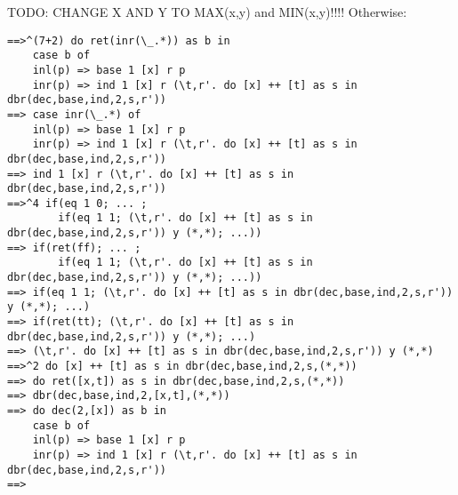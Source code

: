 TODO: CHANGE X AND Y TO MAX(x,y) and MIN(x,y)!!!!
Otherwise:
\begin{verbatim}
==>^(7+2) do ret(inr(\_.*)) as b in 
    case b of
    inl(p) => base 1 [x] r p
    inr(p) => ind 1 [x] r (\t,r'. do [x] ++ [t] as s in dbr(dec,base,ind,2,s,r')) 
==> case inr(\_.*) of 
    inl(p) => base 1 [x] r p
    inr(p) => ind 1 [x] r (\t,r'. do [x] ++ [t] as s in dbr(dec,base,ind,2,s,r')) 
==> ind 1 [x] r (\t,r'. do [x] ++ [t] as s in dbr(dec,base,ind,2,s,r')) 
==>^4 if(eq 1 0; ... ; 
        if(eq 1 1; (\t,r'. do [x] ++ [t] as s in dbr(dec,base,ind,2,s,r')) y (*,*); ...)) 
==> if(ret(ff); ... ; 
        if(eq 1 1; (\t,r'. do [x] ++ [t] as s in dbr(dec,base,ind,2,s,r')) y (*,*); ...)) 
==> if(eq 1 1; (\t,r'. do [x] ++ [t] as s in dbr(dec,base,ind,2,s,r')) y (*,*); ...) 
==> if(ret(tt); (\t,r'. do [x] ++ [t] as s in dbr(dec,base,ind,2,s,r')) y (*,*); ...) 
==> (\t,r'. do [x] ++ [t] as s in dbr(dec,base,ind,2,s,r')) y (*,*)
==>^2 do [x] ++ [t] as s in dbr(dec,base,ind,2,s,(*,*))
==> do ret([x,t]) as s in dbr(dec,base,ind,2,s,(*,*))
==> dbr(dec,base,ind,2,[x,t],(*,*))
==> do dec(2,[x]) as b in 
    case b of
    inl(p) => base 1 [x] r p
    inr(p) => ind 1 [x] r (\t,r'. do [x] ++ [t] as s in dbr(dec,base,ind,2,s,r')) 
==> 


\end{verbatim}



